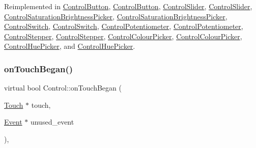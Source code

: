 Reimplemented in \hyperlink{classControlButton_a170cc0df0207fba7bc352acc6173d948}{Control\+Button}, \hyperlink{classControlButton_a1f4736ab73edd357bf9caf9fa0e1dcd6}{Control\+Button}, \hyperlink{classControlSlider_a501e9da8ef3f1dacbfb9f7a12ecb2aed}{Control\+Slider}, \hyperlink{classControlSlider_a8f6fb619bb23b4e1507f1f2bb904f808}{Control\+Slider}, \hyperlink{classControlSaturationBrightnessPicker_a8660ed765c6c5c0d8856f59aa0ba34b2}{Control\+Saturation\+Brightness\+Picker}, \hyperlink{classControlSaturationBrightnessPicker_a4de153e53cccd78b56d9dc3e18411777}{Control\+Saturation\+Brightness\+Picker}, \hyperlink{classControlSwitch_aaba407c9125d0e4cc85fb5ae59ea964c}{Control\+Switch}, \hyperlink{classControlSwitch_a67af886fe24ec32313023514b28991f3}{Control\+Switch}, \hyperlink{classControlPotentiometer_a92d549b600c44bed4fd08d5ff13cbe8e}{Control\+Potentiometer}, \hyperlink{classControlPotentiometer_ae5ab22036e6a15b6a5d388db38f29bc7}{Control\+Potentiometer}, \hyperlink{classControlStepper_a7fbb969bb376da49033a5df63f562905}{Control\+Stepper}, \hyperlink{classControlStepper_a73a5572d0e9ba2a72da9f42884e621e7}{Control\+Stepper}, \hyperlink{classControlColourPicker_aec95ec2b1f58342568c73ecd208d6a12}{Control\+Colour\+Picker}, \hyperlink{classControlColourPicker_a83493e9deb3c69dd40be99009a4759d6}{Control\+Colour\+Picker}, \hyperlink{classControlHuePicker_af178753e94f91d15e613bf0c6387af5b}{Control\+Hue\+Picker}, and \hyperlink{classControlHuePicker_ae14f5994e10b93bec6b4de027902b2a1}{Control\+Hue\+Picker}.

\mbox{\label{classControl_acdbc84186be785b6e2970c93f4252b72}} 
\subsubsection{\texorpdfstring{on\+Touch\+Began()}{onTouchBegan()}\hspace{0.1cm}{\footnotesize\ttfamily [2/2]}}
{\footnotesize\ttfamily virtual bool Control\+::on\+Touch\+Began (\begin{DoxyParamCaption}\item[{\hyperlink{classTouch}{Touch} $\ast$}]{touch,  }\item[{\hyperlink{classEvent}{Event} $\ast$}]{unused\+\_\+event }\end{DoxyParamCaption})\hspace{0.3cm}{\ttfamily [override]}, {\ttfamily [virtual]}}



